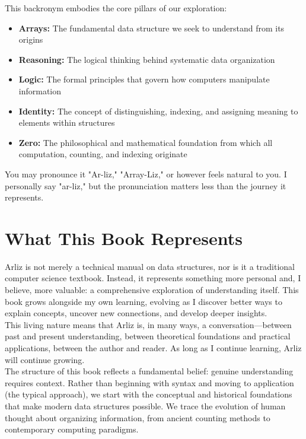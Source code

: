 This backronym embodies the core pillars of our exploration:
\begin{itemize}
	\item \textbf{Arrays:} The fundamental data structure we seek to understand from its origins
	\item \textbf{Reasoning:} The logical thinking behind systematic data organization
	\item \textbf{Logic:} The formal principles that govern how computers manipulate information
	\item \textbf{Identity:} The concept of distinguishing, indexing, and assigning meaning to elements within structures
	\item \textbf{Zero:} The philosophical and mathematical foundation from which all computation, counting, and indexing originate
\end{itemize}

You may pronounce it "Ar-liz," "Array-Liz," or however feels natural to you. I personally say "ar-liz," but the pronunciation matters less than the journey it represents.\\

\section*{What This Book Represents}

Arliz is not merely a technical manual on data structures, nor is it a traditional computer science textbook. Instead, it represents something more personal and, I believe, more valuable: a comprehensive exploration of understanding itself. This book grows alongside my own learning, evolving as I discover better ways to explain concepts, uncover new connections, and develop deeper insights.\\

This living nature means that Arliz is, in many ways, a conversation—between past and present understanding, between theoretical foundations and practical applications, between the author and reader. As long as I continue learning, Arliz will continue growing.\\

The structure of this book reflects a fundamental belief: genuine understanding requires context. Rather than beginning with syntax and moving to application (the typical approach), we start with the conceptual and historical foundations that make modern data structures possible. We trace the evolution of human thought about organizing information, from ancient counting methods to contemporary computing paradigms.\\

